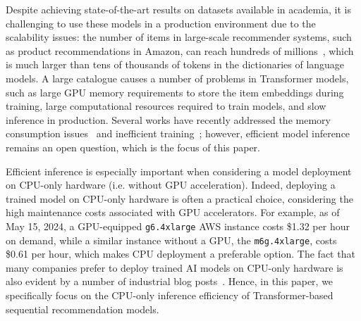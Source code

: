 \documentclass[sigconf,natbib=true, review=true]{acmart} %
\newcommand{\rsasha}[1]{\textcolor[HTML]{FF0000}{#1}}
\begin{document}
 Despite achieving state-of-the-art results on \rsasha{datasets available in academia}, it is challenging to use these models in a production environment due to the scalability issues: the number of items in large-scale recommender systems, such as product recommendations in Amazon, can reach hundreds of millions~\cite{AmazonStatisticsUptoDate}, which is much larger than tens of thousands of tokens in the dictionaries of language models. A large catalogue causes a number of problems in Transformer models, such as large GPU memory requirements to store the item embeddings \rsasha{during training}, large computational resources required to train models, and slow inference in production. Several works have recently addressed the memory consumption issues~\cite{xiaEfficientOnDeviceSessionBased2023, petrovRecJPQTrainingLargeCatalogue2024} and inefficient training~\cite{klenitskiyTurningDrossGold2023, petrovGSASRecReducingOverconfidence2023, petrovRSSEffectiveEfficient2023}; however, efficient model inference remains an open question, which is the focus of this paper.

\rsasha{Efficient inference is especially important when considering a model deployment on CPU-only hardware (i.e. without GPU acceleration). Indeed, deploying a trained model on CPU-only hardware is often a practical choice, considering the high maintenance costs associated with GPU accelerators. For example, as of May 15, 2024, a GPU-equipped \texttt{g6.4xlarge} AWS instance costs \$1.32 per hour on demand, while a similar instance without a GPU, the \texttt{m6g.4xlarge}, costs \$0.61 per hour, which makes CPU deployment a preferable option. The fact that many companies prefer to deploy trained AI models on CPU-only hardware is also evident by a number of industrial blog posts~\cite{gowdaDemocratizingGenerativeAI2024, abidiAIInferenceAcceleration2022, martinWhyCPUsAlso2023}. Hence, in this paper, we specifically focus on the CPU-only inference efficiency of Transformer-based sequential recommendation models.} 
\end{document}
